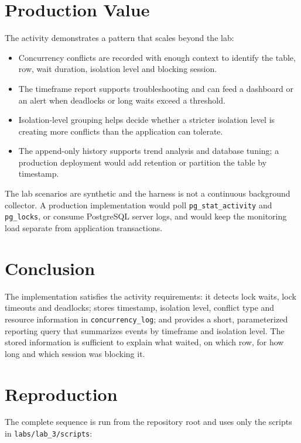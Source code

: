 \documentclass[11pt]{article}
\begin{document}
\section{Production Value}

The activity demonstrates a pattern that scales beyond the lab:

\begin{itemize}
    \item Concurrency conflicts are recorded with enough context to identify
    the table, row, wait duration, isolation level and blocking session.
    \item The timeframe report supports troubleshooting and can feed a
    dashboard or an alert when deadlocks or long waits exceed a threshold.
    \item Isolation-level grouping helps decide whether a stricter isolation
    level is creating more conflicts than the application can tolerate.
    \item The append-only history supports trend analysis and database tuning;
    a production deployment would add retention or partition the table by
    timestamp.
\end{itemize}

The lab scenarios are synthetic and the harness is not a continuous background
collector. A production implementation would poll
\texttt{pg\_stat\_activity} and \texttt{pg\_locks}, or consume PostgreSQL
server logs, and would keep the monitoring load separate from application
transactions.

\section{Conclusion}

The implementation satisfies the activity requirements: it detects lock waits,
lock timeouts and deadlocks; stores timestamp, isolation level, conflict type
and resource information in \texttt{concurrency\_log}; and provides a short,
parameterized reporting query that summarizes events by timeframe and
isolation level. The stored information is sufficient to explain what waited,
on which row, for how long and which session was blocking it.

\section{Reproduction}

The complete sequence is run from the repository root and uses only the scripts
in \texttt{labs/\allowbreak lab\_3/\allowbreak scripts}:
\end{document}

